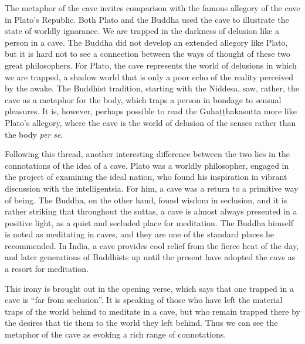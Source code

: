 \documentclass[12pt,openany]{book}%
\begin{document}
The metaphor of the cave invites comparison with the famous allegory of the cave in Plato’s Republic. Both Plato and the Buddha used the cave to illustrate the state of worldly ignorance. We are trapped in the darkness of delusion like a person in a cave. The Buddha did not develop an extended allegory like Plato, but it is hard not to see a connection between the ways of thought of these two great philosophers. For Plato, the cave represents the world of delusions in which we are trapped, a shadow world that is only a poor echo of the reality perceived by the awake. The Buddhist tradition, starting with the Niddesa, saw, rather, the cave as a metaphor for the body, which traps a person in bondage to sensual pleasures. It is, however, perhaps possible to read the \textsanskrit{Guhaṭṭhakasutta} more like Plato’s allegory, where the cave is the world of delusion of the senses rather than the body \emph{per se}.

Following this thread, another interesting difference between the two lies in the connotations of the idea of a cave. Plato was a worldly philosopher, engaged in the project of examining the ideal nation, who found his inspiration in vibrant discussion with the intelligentsia. For him, a cave was a return to a primitive way of being. The Buddha, on the other hand, found wisdom in seclusion, and it is rather striking that throughout the suttas, a cave is almost always presented in a positive light, as a quiet and secluded place for meditation. The Buddha himself is noted as meditating in caves, and they are one of the standard places he recommended. In India, a cave provides cool relief from the fierce heat of the day, and later generations of Buddhists up until the present have adopted the cave as a resort for meditation.

This irony is brought out in the opening verse, which says that one trapped in a cave is “far from seclusion”. It is speaking of those who have left the material traps of the world behind to meditate in a cave, but who remain trapped there by the desires that tie them to the world they left behind. Thus we can see the metaphor of the cave as evoking a rich range of connotations.
\end{document}
